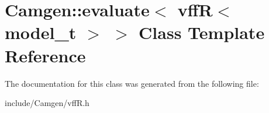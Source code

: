 \hypertarget{a00205}{\section{Camgen\-:\-:evaluate$<$ vff\-R$<$ model\-\_\-t $>$ $>$ Class Template Reference}
\label{a00205}
}


The documentation for this class was generated from the following file\-:\begin{DoxyCompactItemize}
\item 
include/\-Camgen/vff\-R.\-h\end{DoxyCompactItemize}
